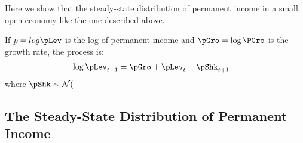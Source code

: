 \documentclass[../BufferStockTheory.tex]{subfiles}
\begin{document}

  \providecommand{\pLog}{\ensuremath{p}}

  Here we show that the steady-state distribution of permanent income in a
  small open economy like the one described above.

  If $\pLog = log \pLev$ is the log of permanent income and $\pGro = \log \PGro$ is the growth rate, the process is:  
  \begin{equation}\begin{gathered}\begin{aligned}
    \log \pLev_{t+1} & = \pGro + \pLev_{t} + \pShk_{t+1}
  \end{aligned}\end{gathered}\end{equation}
  where $\pShk \sim \mathcal{N}($
\subsection{The Steady-State Distribution of Permanent Income}

\onlyinsubfile{}
\end{document}
